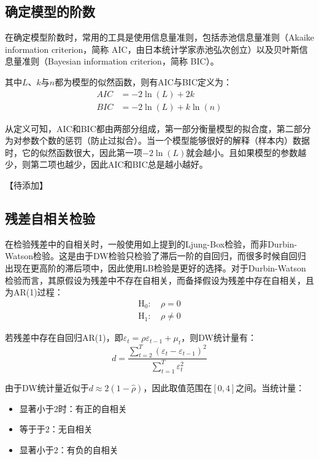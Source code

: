 \documentclass[11pt]{article}
\begin{document}
\subsection{确定模型的阶数}

在确定模型阶数时，常用的工具是使用信息量准则，包括赤池信息量准则（Akaike information criterion，简称 AIC，由日本统计学家赤池弘次创立）以及贝叶斯信息量准则（Bayesian information criterion，简称 BIC）。

其中$L$、$k$与$n$都为模型的似然函数，则有AIC与BIC定义为：
\begin{align*}
    AIC &= -2 \ln(L) + 2k \\
    BIC &= -2 \ln(L) + k\ln(n)
\end{align*}

从定义可知，AIC和BIC都由两部分组成，第一部分衡量模型的拟合度，第二部分为对参数个数的惩罚（防止过拟合）。当一个模型能够很好的解释（样本内）数据时，它的似然函数很大，因此第一项$-2\ln(L)$就会越小。且如果模型的参数越少，则第二项也越少，因此AIC和BIC总是越小越好。

【待添加】

\subsection{残差自相关检验}

在检验残差中的自相关时，一般使用如上提到的Ljung-Box检验，而非Durbin-Watson检验。这是由于DW检验只检验了滞后一阶的自回归，而很多时候自回归出现在更高阶的滞后项中，因此使用LB检验是更好的选择。对于Durbin-Watson检验而言，其原假设为残差中不存在自相关，而备择假设为残差中存在自相关，且为AR(1)过程：
\begin{align*}
    \text{H}_0: \ & \rho = 0 \\
    \text{H}_1: \ & \rho \neq 0
\end{align*}

若残差中存在自回归AR(1)，即$\varepsilon_t = \rho \varepsilon_{t-1} + \mu_t$，则DW统计量有：
\begin{equation*}
    d = \frac{\sum_{t=2}^{T} (\varepsilon_t - \varepsilon_{t-1})^2}{\sum_{t=1}^{T} \varepsilon^2_t}
\end{equation*}

由于DW统计量近似于$d \approx 2(1-\hat{\rho})$，因此取值范围在$[0,4]$之间。当统计量：
\begin{itemize}
    \item 显著小于2时：有正的自相关
    \item 等于于2：无自相关
    \item 显著小于2：有负的自相关
\end{itemize}
\end{document}
